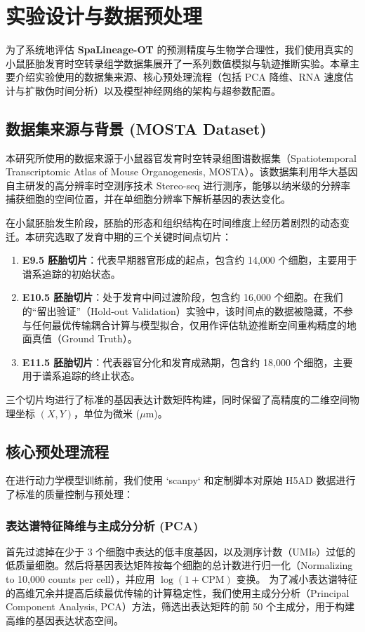 
\chapter{实验设计与数据预处理}
\label{ch:experiments}

为了系统地评估 \textbf{SpaLineage-OT} 的预测精度与生物学合理性，我们使用真实的小鼠胚胎发育时空转录组学数据集展开了一系列数值模拟与轨迹推断实验。本章主要介绍实验使用的数据集来源、核心预处理流程（包括 PCA 降维、RNA 速度估计与扩散伪时间分析）以及模型神经网络的架构与超参数配置。

\section{数据集来源与背景 (MOSTA Dataset)}
本研究所使用的数据来源于小鼠器官发育时空转录组图谱数据集（Spatiotemporal Transcriptomic Atlas of Mouse Organogenesis, MOSTA）\cite{Chen2022}。该数据集利用华大基因自主研发的高分辨率时空测序技术 Stereo-seq 进行测序，能够以纳米级的分辨率捕获细胞的空间位置，并在单细胞分辨率下解析基因的表达变化。

在小鼠胚胎发生阶段，胚胎的形态和组织结构在时间维度上经历着剧烈的动态变迁。本研究选取了发育中期的三个关键时间点切片：
\begin{enumerate}
    \item \textbf{E9.5 胚胎切片}：代表早期器官形成的起点，包含约 14,000 个细胞，主要用于谱系追踪的初始状态。
    \item \textbf{E10.5 胚胎切片}：处于发育中间过渡阶段，包含约 16,000 个细胞。在我们的“留出验证”（Hold-out Validation）实验中，该时间点的数据被隐藏，不参与任何最优传输耦合计算与模型拟合，仅用作评估轨迹推断空间重构精度的地面真值（Ground Truth）。
    \item \textbf{E11.5 胚胎切片}：代表器官分化和发育成熟期，包含约 18,000 个细胞，主要用于谱系追踪的终止状态。
\end{enumerate}
三个切片均进行了标准的基因表达计数矩阵构建，同时保留了高精度的二维空间物理坐标 $(X, Y)$，单位为微米 ($\mu$m)。

\section{核心预处理流程}
在进行动力学模型训练前，我们使用 `scanpy` 和定制脚本对原始 H5AD 数据进行了标准的质量控制与预处理：

\subsection{表达谱特征降维与主成分分析 (PCA)}
首先过滤掉在少于 3 个细胞中表达的低丰度基因，以及测序计数（UMIs）过低的低质量细胞。然后将基因表达矩阵按每个细胞的总计数进行归一化（Normalizing to 10,000 counts per cell），并应用 $\log(1 + \text{CPM})$ 变换。
为了减小表达谱特征的高维冗余并提高后续最优传输的计算稳定性，我们使用主成分分析（Principal Component Analysis, PCA）方法，筛选出表达矩阵的前 50 个主成分，用于构建高维的基因表达状态空间。

